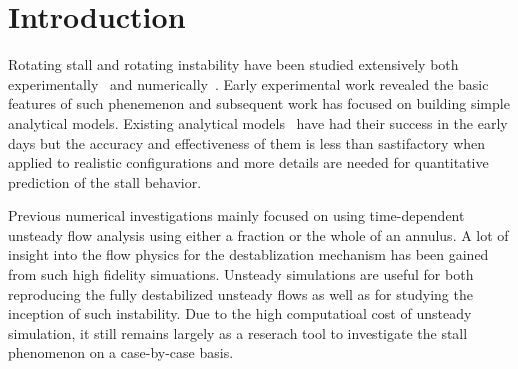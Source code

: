 \documentclass[journal,final]{new-aiaa}
\begin{document}
%
%


\section{Introduction}
Rotating stall and rotating instability have been studied extensively
both experimentally~\cite{emmons1955compressor,frank1955propagation,emmons1959survey}
and numerically~\cite{cornelius2014experimental,he1997computational,vo2008control,pullan2015origins}.
Early experimental work revealed
the basic features of such phenemenon and subsequent work has focused
on building simple analytical models.
Existing analytical models~\cite{emmons1955compressor,greitzer1986theory} have
had their success in the early days but the accuracy and effectiveness of them
is less than sastifactory when applied to realistic configurations and
more details are needed for quantitative prediction of the stall behavior.

Previous numerical investigations mainly focused on using time-dependent
unsteady flow analysis using either a fraction or the whole of an annulus.
A lot of insight into the flow physics for the destablization mechanism
has been gained from such high fidelity simuations. Unsteady simulations
are useful for both reproducing the fully destabilized unsteady flows as
well as for studying the inception of such instability. Due to the high
computatioal cost of unsteady simulation, it still remains largely as a
reserach tool to investigate the stall phenomenon on a case-by-case
basis.
\end{document}
